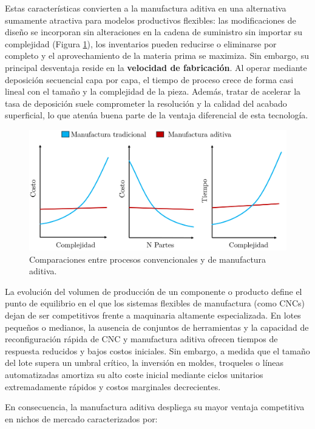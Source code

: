 Estas características convierten a la manufactura aditiva en una alternativa sumamente atractiva para modelos productivos flexibles: las modificaciones de diseño se incorporan sin alteraciones en la cadena de suministro sin importar su complejidad (Figura \ref{grafsmm}), los inventarios pueden reducirse o eliminarse por completo y el aprovechamiento de la materia prima se maximiza. Sin embargo, su principal desventaja reside en la \textbf{velocidad de fabricación}. Al operar mediante deposición secuencial capa por capa, el tiempo de proceso crece de forma casi lineal con el tamaño y la complejidad de la pieza. Además, tratar de acelerar la tasa de deposición suele comprometer la resolución y la calidad del acabado superficial, lo que atenúa buena parte de la ventaja diferencial de esta tecnología.

\begin{figure}[h!]
	\centering
	\includegraphics[width=0.9\linewidth]{imgs/grafsmm.png}
	\caption{Comparaciones entre procesos convencionales y de manufactura aditiva.}
	\label{grafsmm}
\end{figure}

La evolución del volumen de producción de un componente o producto define el punto de equilibrio en el que los sistemas flexibles de manufactura (como CNCs) dejan de ser competitivos frente a maquinaria altamente especializada. En lotes pequeños o medianos, la ausencia de conjuntos de herramientas y la capacidad de reconfiguración rápida de CNC y manufactura aditiva ofrecen tiempos de respuesta reducidos y bajos costos iniciales. Sin embargo, a medida que el tamaño del lote supera un umbral crítico, la inversión en moldes, troqueles o líneas automatizadas amortiza su alto coste inicial mediante ciclos unitarios extremadamente rápidos y costos marginales decrecientes.  

En consecuencia, la manufactura aditiva despliega su mayor ventaja competitiva en nichos de mercado caracterizados por:

